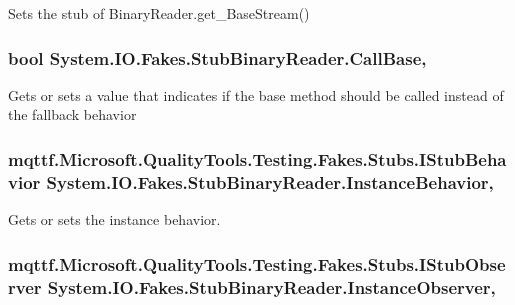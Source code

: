 Sets the stub of Binary\-Reader.\-get\-\_\-\-Base\-Stream()

\hypertarget{class_system_1_1_i_o_1_1_fakes_1_1_stub_binary_reader_afd30a2af1eaea5ff8e2f0ec676f4f809}{
\subsubsection[{Call\-Base}]{\setlength{\rightskip}{0pt plus 5cm}bool System.\-I\-O.\-Fakes.\-Stub\-Binary\-Reader.\-Call\-Base\hspace{0.3cm}{\ttfamily [get]}, {\ttfamily [set]}}}\label{class_system_1_1_i_o_1_1_fakes_1_1_stub_binary_reader_afd30a2af1eaea5ff8e2f0ec676f4f809}


Gets or sets a value that indicates if the base method should be called instead of the fallback behavior

\hypertarget{class_system_1_1_i_o_1_1_fakes_1_1_stub_binary_reader_a95cda755b17428a183801601449150ce}{
\subsubsection[{Instance\-Behavior}]{\setlength{\rightskip}{0pt plus 5cm}mqttf.\-Microsoft.\-Quality\-Tools.\-Testing.\-Fakes.\-Stubs.\-I\-Stub\-Behavior System.\-I\-O.\-Fakes.\-Stub\-Binary\-Reader.\-Instance\-Behavior\hspace{0.3cm}{\ttfamily [get]}, {\ttfamily [set]}}}\label{class_system_1_1_i_o_1_1_fakes_1_1_stub_binary_reader_a95cda755b17428a183801601449150ce}


Gets or sets the instance behavior.

\hypertarget{class_system_1_1_i_o_1_1_fakes_1_1_stub_binary_reader_af91fa35db818aee179996cbcf6fb128e}{
\subsubsection[{Instance\-Observer}]{\setlength{\rightskip}{0pt plus 5cm}mqttf.\-Microsoft.\-Quality\-Tools.\-Testing.\-Fakes.\-Stubs.\-I\-Stub\-Observer System.\-I\-O.\-Fakes.\-Stub\-Binary\-Reader.\-Instance\-Observer\hspace{0.3cm}{\ttfamily [get]}, {\ttfamily [set]}}}\label{class_system_1_1_i_o_1_1_fakes_1_1_stub_binary_reader_af91fa35db818aee179996cbcf6fb128e}


